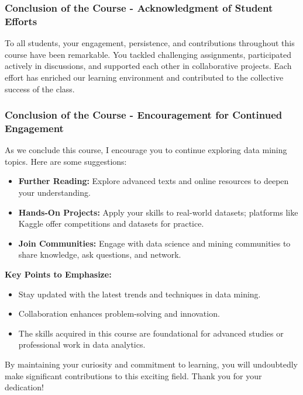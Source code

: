 \documentclass[aspectratio=169]{beamer}
\begin{document}
\begin{frame}[fragile]
    \frametitle{Conclusion of the Course - Acknowledgment of Student Efforts}
    To all students, your engagement, persistence, and contributions throughout this course have been remarkable. You tackled challenging assignments, participated actively in discussions, and supported each other in collaborative projects. Each effort has enriched our learning environment and contributed to the collective success of the class.
\end{frame}

\begin{frame}[fragile]
    \frametitle{Conclusion of the Course - Encouragement for Continued Engagement}
    As we conclude this course, I encourage you to continue exploring data mining topics. Here are some suggestions:

    \begin{itemize}
        \item \textbf{Further Reading:} 
        Explore advanced texts and online resources to deepen your understanding.
        
        \item \textbf{Hands-On Projects:} 
        Apply your skills to real-world datasets; platforms like Kaggle offer competitions and datasets for practice.
        
        \item \textbf{Join Communities:} 
        Engage with data science and mining communities to share knowledge, ask questions, and network.
    \end{itemize}

    \textbf{Key Points to Emphasize:}
    \begin{itemize}
        \item Stay updated with the latest trends and techniques in data mining.
        \item Collaboration enhances problem-solving and innovation.
        \item The skills acquired in this course are foundational for advanced studies or professional work in data analytics.
    \end{itemize}

    By maintaining your curiosity and commitment to learning, you will undoubtedly make significant contributions to this exciting field. Thank you for your dedication!
\end{frame}
\end{document}
